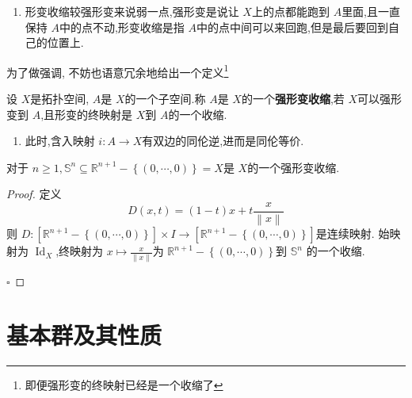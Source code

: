 \documentclass[../../几何与拓扑.tex]{subfiles}
\begin{document}
\begin{remark}
    \begin{enumerate}
        \item 形变收缩较强形变来说弱一点,强形变是说让 \(  X  \)上的点都能跑到 \(  A  \)里面,且一直保持 \(  A  \)中的点不动,形变收缩是指 \(  A  \)中的点中间可以来回跑,但是最后要回到自己的位置上.     
    \end{enumerate}
    
\end{remark}


为了做强调, 不妨也语意冗余地给出一个定义\footnote{即便强形变的终映射已经是一个收缩了}
\begin{definition}
    设 \(  X  \)是拓扑空间, \(  A  \)是 \(  X  \)的一个子空间.称 \(  A  \)是 \(  X  \)的一个\textbf{强形变收缩},若 \(  X  \)可以强形变到 \(  A  \),且形变的终映射是 \(  X  \)到 \(  A  \)的一个收缩.      
\end{definition}

\begin{remark}
    \begin{enumerate}
        \item 此时,含入映射 \(  i: A \to X  \)有双边的同伦逆,进而是同伦等价. 
    \end{enumerate}
    
\end{remark}

\begin{example}
    对于 \(  n\ge 1, \mathbb{S}^{n} \subseteq \mathbb{R} ^{n+ 1} - \left\{ \left( 0,\cdots ,0 \right)  \right\}= X  \)是 \(  X  \)的一个强形变收缩.         
\end{example}

\begin{proof}

        定义 \[
        D\left( x,t \right)= \left( 1-t \right)x +  t \frac{x }{\left\| x \right\| }   
        \]则 \( D: [\mathbb{R} ^{n+ 1}-\left\{ \left( 0,\cdots ,0 \right)  \right\}]\times I \to  [\mathbb{R} ^{n+ 1}-\left\{ \left( 0,\cdots ,0 \right)  \right\}]  \)是连续映射.
        始映射为 \(  \operatorname{Id}_{X}  \),终映射为 \(  x \mapsto \frac{x }{\left\| x \right\| }   \)为 \(  \mathbb{R} ^{n+ 1}-\left\{ \left( 0,\cdots ,0 \right)  \right\}  \)到 \(  \mathbb{S}^{n}  \)    的一个收缩.

    \hfill $\square$
\end{proof}

\hspace*{\fill} 

\section{基本群及其性质}
\end{document}
